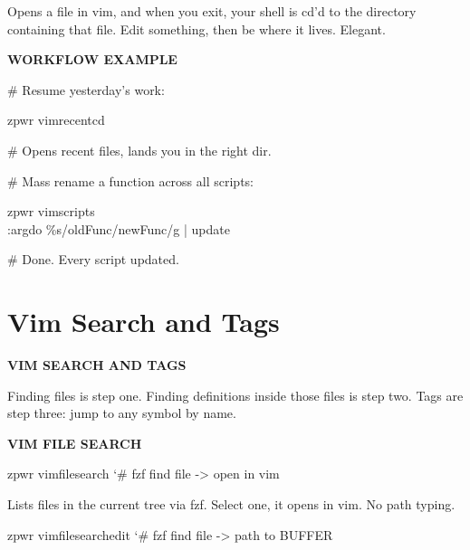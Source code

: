 \documentclass[11pt,a4paper,twoside]{book}
\begin{document}
Opens a file in vim, and when you exit, your shell is cd'd to the directory containing that file. Edit something, then be where it lives. Elegant.


\vspace{12pt}
{\bfseries\color{neonyellow} WORKFLOW EXAMPLE}\vspace{4pt}

\# Resume yesterday's work:

\begin{codebox}
\color{neongreen}zpwr vimrecentcd\\
\end{codebox}

\# Opens recent files, lands you in the right dir.

\# Mass rename a function across all scripts:

\begin{codebox}
\color{neongreen}zpwr vimscripts\\
\color{neongreen}:argdo \%s/oldFunc/newFunc/g | update\\
\end{codebox}

\# Done. Every script updated.


\vspace{16pt}

\section{Vim Search and Tags}


\vspace{10pt}
{\large\bfseries\color{neoncyan} VIM SEARCH AND TAGS}\vspace{6pt}

Finding files is step one. Finding definitions inside those files is step two. Tags are step three: jump to any symbol by name.


\vspace{12pt}
{\bfseries\color{neonyellow} VIM FILE SEARCH}\vspace{4pt}

\begin{codebox}
\color{neongreen}zpwr vimfilesearch          {\char`\#} fzf find file -> open in vim\\
\end{codebox}

Lists files in the current tree via fzf. Select one, it opens in vim. No path typing.

\begin{codebox}
\color{neongreen}zpwr vimfilesearchedit      {\char`\#} fzf find file -> path to BUFFER\\
\end{codebox}
\end{document}
